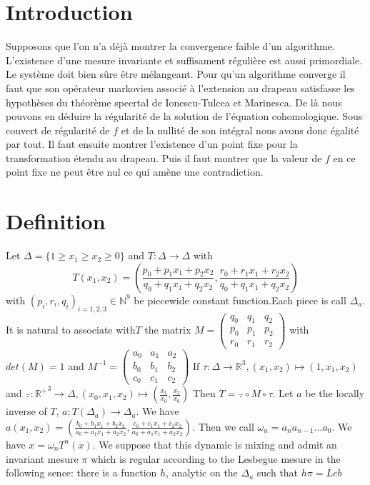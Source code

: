 \documentclass[12pt]{article}
\theoremstyle{plain}%
\theoremstyle{definition}
\theoremstyle{remark}
\begin{document}
\tableofcontents
\section*{Introduction}
Supposons que l'on n'a déjà montrer la convergence faible d'un algorithme.
L'existence d'une mesure invariante et suffisament régulière est aussi primordiale.
Le système doit bien sûre être mélangeant.
Pour qu'un algorithme converge il faut que son opérateur markovien associé à l'extension au drapeau satisfasse les hypothèses du théorème specrtal de Ionescu-Tulcea et Marinesca.
De là nous pouvons en déduire la régularité de la solution de l'équation cohomologique.
Sous couvert de régularité de $f$ et de la nullité de son intégral nous avons donc égalité par tout. Il faut ensuite montrer l'existence d'un point fixe pour la transformation étendu au drapeau.
Puis il faut montrer que la valeur de $f$ en ce point fixe ne peut être nul ce qui amène une contradiction.
\section{Definition}
Let $\Delta=\{ 1 \geq x_1 \geq x_2 \geq 0 \}$ and $T:\Delta \to \Delta$ with \[ T(x_1,x_2)=(\frac{p_0+p_1 x_1+p_2 x_2}{q_0+q_1 x_1 +q_2 x_2},\frac{r_0+r_1 x_1+r_2 x_2}{q_0+q_1 x_1 +q_2 x_2}) \] with $(p_i,r_i,q_i)_{i=1,2,3}\in \mathbb{N}^9$ be piecewide constant function.Each piece is call $\Delta_a$. It is natural to associate with$T $ the matrix $M=\begin{pmatrix} q_0 & q_1 & q_2 \\ p_0 & p_1 & p_2 \\ r_0 & r_1 & r_2 \end{pmatrix}$ with $det(M)=1$ and $M^{-1}=\begin{pmatrix} a_0 & a_1 & a_2 \\ b_0 & b_1 & b_2 \\ c_0 & c_1 & c_2 \end{pmatrix}$
If $\tau: \Delta \to \mathbb{R}^3, (x_1,x_2) \mapsto (1,x_1,x_2)$ and $\overset{-}{.}: \mathbb{R^+}^3 \to \Delta,(x_0,x_1,x_2) \mapsto (\frac{x_1}{x_0},\frac{x_2}{x_0})$
Then $T=\overset{-}{.} \circ M \circ \tau$.\newline
Let $a$ be the locally inverse of $T$, $a:T(\Delta_a) \to \Delta_a$. We have $a(x_1,x_2)=(\frac{b_0+b_1 x_1 + b_2 x_2}{a_0 + a_1 x_1 + a_2 x_2},\frac{c_0 + c_1 x_1 + c_2 x_2}{a_0 + a_1 x_1 + a_2 x_2})$. Then we call $\omega_n=a_n a_{n-1} ... a_0$.\newline
We have $x=\omega_n T^n(x)$.
\newline
\color{green}
We suppose that this dynamic is mixing and admit an invariant mesure $\pi$ which is regular according to the Lesbegue mesure in the following sence: there is a function $h$, analytic on the $\Delta_a$ such that $h \pi= Leb$
\color{black}
\end{document}
